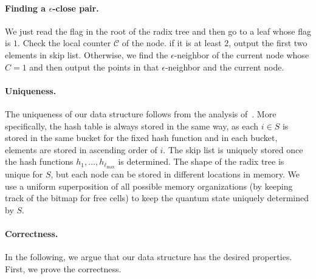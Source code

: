 \documentclass[10pt,a4paper]{article}
\begin{document}
\paragraph{Finding a $\epsilon$-close pair.} We just read the flag in the root of the radix tree and then go to a leaf whose flag is $1$. Check the local counter $\mathcal{C}$ of the node. if it is at least $2$, output the first two elements in skip list. Otherwise, we find the $\epsilon$-neighbor of the current node whose $C=1$ and then output the points in that $\epsilon$-neighbor and the current node. 


\paragraph{Uniqueness.}
The uniqueness of our data structure follows from the analysis of~\cite{r5,r11,r28}. More specifically, the hash table is always stored in the same way, as each $i \in S$ is stored in the same bucket for the fixed hash function and in each bucket, elements are stored in ascending order of $i$. The skip list is uniquely stored once the hash functions $h_1, \ldots, h_{\ell_{\max}}$ is determined. The shape of the radix tree is unique for $S$, but each node can be stored in different locations in memory. We use a uniform superposition of all possible memory organizations (by keeping track of the bitmap for free cells) to keep the quantum state uniquely determined by $S$.

\paragraph{Correctness.}
In the following, we argue that our data structure has the desired properties. First, we prove the correctness.
\end{document}
